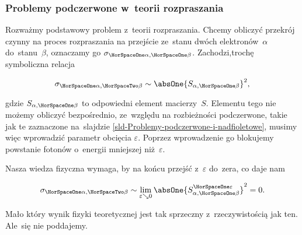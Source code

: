 \documentclass[10pt,t]{beamer}
\begin{document}
\begin{frame}
  \frametitle{Problemy podczerwone w~teorii rozpraszania}


  Rozważmy podstawowy problem z~teorii rozpraszania. Chcemy obliczyć
  przekrój czynny na proces rozpraszania na przejście ze~stanu dwóch
  elektronów~$\alpha$ do~stanu~$\beta$, oznaczamy go
  $\sigma_{ \HorSpaceOne \alpha, \HorSpaceOne \beta }$. Zachodzi,trochę symboliczna relacja

  \vspace{-2.2em}


  \begin{equation}
    \label{eq:Efekt-Casimira-01}
    \sigma_{ \HorSpaceOne \alpha, \HorSpaceTwo \beta } \sim
    \absOne{ S_{ \alpha, \HorSpaceOne \beta } }^{ 2 },
  \end{equation}

  \vspace{-1.8em}


  gdzie $S_{ \alpha, \HorSpaceOne \beta }$ to odpowiedni element macierzy~$S$. Elementu
  tego nie możemy obliczyć bezpośrednio, ze~względu na rozbieżności
  podczerwone, takie jak te zaznaczone na~slajdzie
  \eqref{sld-Problemy-podczerwone-i-nadfioletowe}, musimy więc wprowadzić
  parametr obcięcia $\varepsilon$. Poprzez wprowadzenie go blokujemy powstanie
  fotonów o~energii mniejszej niż~$\varepsilon$.

  Nasza wiedza fizyczna wymaga, by na końcu przejść z~$\varepsilon$ do~zera,
  co daje nam

  \vspace{-2.3em}


  \begin{equation}
    \label{eq:Efekt-Casimira-01}
    \sigma_{ \HorSpaceOne \alpha, \HorSpaceTwo \beta } \sim \lim_{ \varepsilon \searrow 0 }
    \absOne{ S_{ \alpha, \HorSpaceOne \beta }^{ \HorSpaceOne \varepsilon } }^{ 2 } = 0.
  \end{equation}

  \vspace{-1.7em}


  Mało który wynik fizyki teoretycznej jest tak sprzeczny z~rzeczywistością
  jak ten. Ale~się nie poddajemy.

\end{frame}
\end{document}
